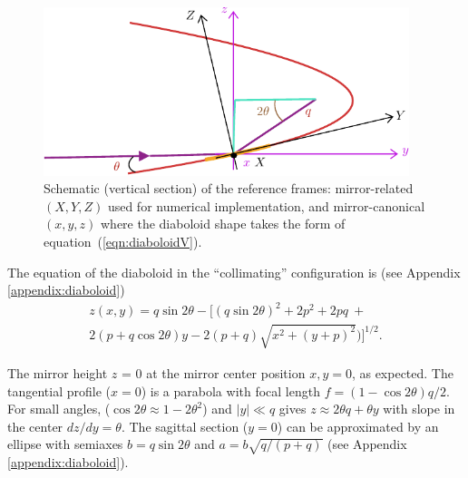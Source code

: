 \documentclass[preprint]{iucr}       %
\begin{document}


\begin{figure}
    \centering
    \includegraphics[width=0.95\textwidth]{figures/fig1.pdf}
    \caption{Schematic (vertical section) of the reference frames: mirror-related $(X,Y,Z)$ used for numerical implementation, and mirror-canonical $(x,y,z)$ where the diaboloid shape takes the form of equation~(\ref{eqn:diaboloidV}). }
    \label{fig:frame}
\end{figure}

The equation of the diaboloid in the ``collimating'' configuration is (see Appendix \ref{appendix:diaboloid})
\begin{multline}
\label{eqn:diaboloidV}
z(x,y) = q \sin2\theta - 
[ (q \sin{2\theta})^2 + 2p^2 + 2 p q~+\\
2 (p + q \cos{2\theta}) y - 2 (p+q) \sqrt{x^2 + (y + p)^2}) ]^{1/2}.
\end{multline}

The mirror height $z$ = 0 at the mirror center position $x, y = 0$, as expected. The tangential profile ($x=0$) is a parabola with focal length $ f = (1-\cos2\theta) q/2$. For small angles, ($\cos2\theta\approx 1 - 2\theta^2$) and $|y|\ll q$ gives $z\approx 2 \theta q + \theta y$ with slope in the center $dz/dy=\theta$. The sagittal section ($y=0$) can be approximated by an ellipse with semiaxes $b=q \sin2\theta$ and $a=b \sqrt{q /(p+q)}$ (see Appendix \ref{appendix:diaboloid}). 
\end{document}
